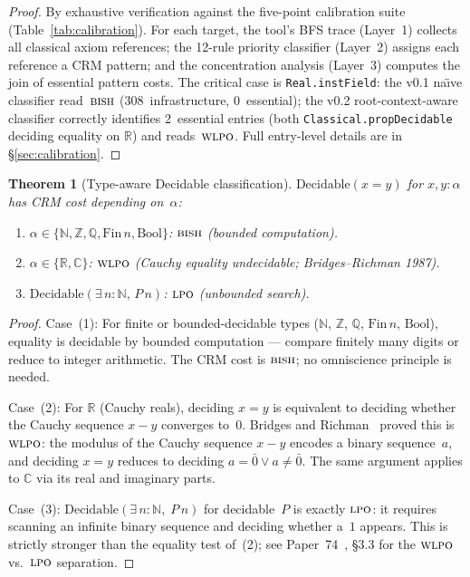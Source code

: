 \documentclass[12pt, a4paper]{article}
\theoremstyle{plain}
\newtheorem{theorem}{Theorem}[section]
\theoremstyle{definition}
\theoremstyle{remark}
\newcommand{\BISH}{\textsc{bish}}
\newcommand{\WLPO}{\textsc{wlpo}}
\newcommand{\LPO}{\textsc{lpo}}
\begin{document}
\begin{proof}
By exhaustive verification against the five-point calibration
suite (Table~\ref{tab:calibration}).  For each target, the tool's
BFS trace (Layer~1) collects all classical axiom references; the
12-rule priority classifier (Layer~2) assigns each reference a CRM
pattern; and the concentration analysis (Layer~3) computes the join
of essential pattern costs.  The critical case is
\texttt{Real.instField}: the v0.1 na\"{\i}ve classifier read~$\BISH$
(308~infrastructure, 0~essential); the v0.2 root-context-aware
classifier correctly identifies 2~essential entries (both
\texttt{Classical.propDecidable} deciding equality on $\mathbb{R}$)
and reads~$\WLPO$.  Full entry-level details are in
\S\ref{sec:calibration}.
\end{proof}

\begin{theorem}[Type-aware Decidable classification]\label{thm:B}
  $\mathrm{Decidable}(x = y)$ for $x, y : \alpha$ has CRM cost
  depending on~$\alpha$:
  \begin{enumerate}[nosep]
    \item $\alpha \in \{\mathbb{N}, \mathbb{Z}, \mathbb{Q}, \mathrm{Fin}\,n, \mathrm{Bool}\}$: $\BISH$ (bounded computation).
    \item $\alpha \in \{\mathbb{R}, \mathbb{C}\}$: $\WLPO$ (Cauchy equality undecidable; Bridges--Richman 1987).
    \item $\mathrm{Decidable}(\exists\, n : \mathbb{N},\, P\,n)$: $\LPO$ (unbounded search).
  \end{enumerate}
\end{theorem}

\begin{proof}
Case~(1): For finite or bounded-decidable types ($\mathbb{N}$,
$\mathbb{Z}$, $\mathbb{Q}$, $\mathrm{Fin}\,n$, $\mathrm{Bool}$),
equality is decidable by bounded computation --- compare finitely
many digits or reduce to integer arithmetic.  The CRM cost is
$\BISH$; no omniscience principle is needed.

Case~(2): For $\mathbb{R}$ (Cauchy reals), deciding $x = y$ is
equivalent to deciding whether the Cauchy sequence $x - y$
converges to~$0$.  Bridges and Richman~\cite{bridges-richman}
proved this is $\WLPO$: the modulus of the Cauchy sequence
$x - y$ encodes a binary sequence~$a$, and deciding $x = y$
reduces to deciding $a = \bar{0} \lor a \neq \bar{0}$.  The
same argument applies to $\mathbb{C}$ via its real and imaginary
parts.

Case~(3): $\mathrm{Decidable}(\exists\,n : \mathbb{N},\;P\,n)$ for
decidable~$P$ is exactly $\LPO$: it requires scanning an infinite
binary sequence and deciding whether a~$1$ appears.  This is
strictly stronger than the equality test of~(2); see
Paper~74~\cite{lee-p74}, \S3.3 for the $\WLPO$ vs.\ $\LPO$
separation.
\end{proof}
\end{document}
